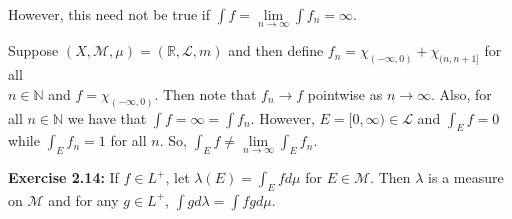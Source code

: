 \documentclass{book}
\newcommand{\exTwoP}{%
   \color{RedViolet}%
   \fontsize{13}{15}\selectfont%
}
\newenvironment{myIndent}{%
   \begin{adjustwidth}{2.5em}{0em}%
}{%
   \end{adjustwidth}%
}
\newcommand{\blab}[1]{\textbf{#1}}
\newcommand{\retTwo}{\hfill\bigbreak}
\begin{document}
\retTwo

However, this need not be true if $\int f = \lim\limits_{n \rightarrow \infty} \int f_n = \infty$.


\begin{myIndent}\exTwoP
   Suppose $(X, \mathcal{M}, \mu) = (\mathbb{R}, \mathcal{L}, m)$ and then define $f_n = \chi_{(-\infty, 0)} + \chi_{(n, n+1]}$ for all\\ $n \in \mathbb{N}$ and $f = \chi_{(-\infty, 0)}$. Then note that $f_n \rightarrow f$ pointwise as $n \rightarrow \infty$. Also, for\\ all $n \in \mathbb{N}$ we have that $\int f = \infty = \int f_n$. However, $E = [0, \infty) \in \mathcal{L}$ and $\int_E f = 0$\\ while $\int_E f_n = 1$ for all $n$. So, $\int_E f \neq \lim\limits_{n \rightarrow \infty} \int_E f_n$.\retTwo
\end{myIndent}

\retTwo

\blab{Exercise 2.14:} If $f \in L^+$, let $\lambda(E) = \int_E fd\mu$ for $E \in \mathcal{M}$. Then $\lambda$ is a measure on $\mathcal{M}$ and for any $g \in L^+$, $\int g d\lambda = \int fgd\mu$.
\end{document}
